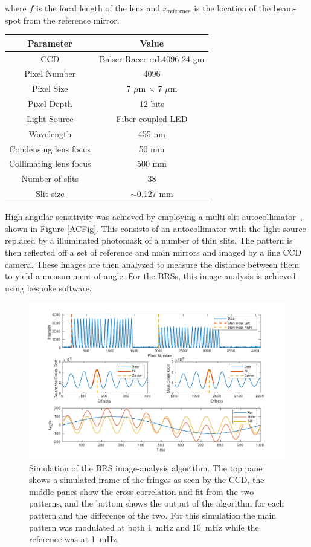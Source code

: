\documentclass [12pt, proquest]{uwthesis}[2019]
\begin{document}
where $f$ is the focal length of the lens and $x_\text{reference}$ is the location of the beam-spot from the reference mirror.

\begin{center}
\begin{tabular}{| c | c |}
\hline
Parameter & Value\\
\hline \hline
CCD & Balser Racer raL4096-24 gm\\
Pixel Number & 4096\\
Pixel Size & 7 $\mu$m $\times$ 7 $\mu$m\\
Pixel Depth & 12 bits\\
Light Source & Fiber coupled LED\\
Wavelength & 455 nm\\
Condensing lens focus & 50 mm\\
Collimating lens focus & 500 mm\\
Number of slits & 38\\
Slit size & $\sim$0.127 mm\\
\hline
\end{tabular}
\label{ACTable}
\end{center}

High angular sensitivity was achieved by employing a multi-slit autocollimator~\cite{MSA}, shown in Figure \ref{ACFig}. This consists of an autocollimator with the light source replaced by a illuminated photomask of a number of thin slits. The pattern is then reflected off a set of reference and main mirrors and imaged by a line CCD camera. These images are then analyzed to measure the distance between them to yield a measurement of angle. For the BRSs, this image analysis is achieved using bespoke software.\cite{BRSReadout}


\begin{figure}[!h]
\begin{center}
 \includegraphics[width=\textwidth]{BRS_ImgAnalysis.pdf}
\caption[Simulation of the BRS image analysis algorithm]{Simulation of the BRS image-analysis algorithm. The top pane shows a simulated frame of the fringes as seen by the CCD, the middle panes show the cross-correlation and fit from the two patterns, and the bottom shows the output of the algorithm for each pattern and the difference of the two. For this simulation the main pattern was modulated at both 1~mHz and 10~mHz while the reference was at 1~mHz.}
\label{ImgAnalysis}
\end{center}
\end{figure}
\end{document}

